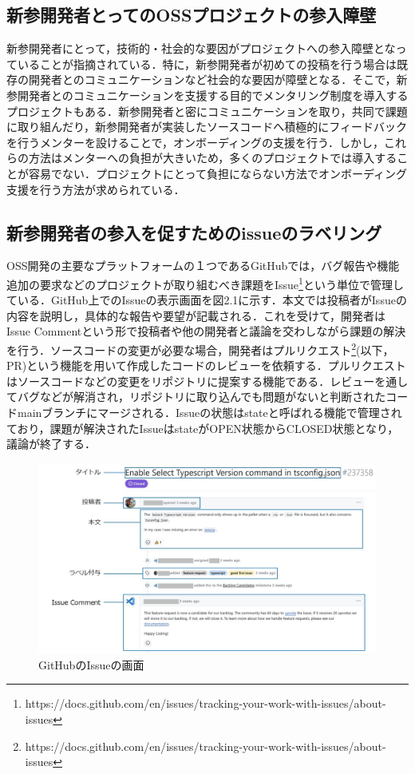 \documentclass[11pt]{jreport}
\begin{document}
\subsection{新参開発者とってのOSSプロジェクトの参入障壁}
新参開発者にとって，技術的・社会的な要因がプロジェクトへの参入障壁となっていることが指摘されている\cite{sosial}．特に，新参開発者が初めての投稿を行う場合は既存の開発者とのコミュニケーションなど社会的な要因が障壁となる\cite{social barries}．そこで，新参開発者とのコミュニケーションを支援する目的でメンタリング制度\cite{menter1}\cite{menter2}を導入するプロジェクトもある．新参開発者と密にコミュニケーションを取り，共同で課題に取り組んだり，新参開発者が実装したソースコードへ積極的にフィードバックを行うメンターを設けることで，オンボーディングの支援を行う．しかし，これらの方法はメンターへの負担が大きいため，多くのプロジェクトでは導入することが容易でない．プロジェクトにとって負担にならない方法でオンボーディング支援を行う方法が求められている．

\subsection{新参開発者の参入を促すためのissueのラベリング}
OSS開発の主要なプラットフォームの１つであるGitHubでは，バグ報告や機能追加の要求などのプロジェクトが取り組むべき課題をIssue\footnote{https://docs.github.com/en/issues/tracking-your-work-with-issues/about-issues}という単位で管理している．GitHub上でのIssueの表示画面を図2.1に示す．本文では投稿者がIssueの内容を説明し，具体的な報告や要望が記載される．これを受けて，開発者はIssue Commentという形で投稿者や他の開発者と議論を交わしながら課題の解決を行う．ソースコードの変更が必要な場合，開発者はプルリクエスト\footnote{https://docs.github.com/en/issues/tracking-your-work-with-issues/about-issues}(以下，PR)という機能を用いて作成したコードのレビューを依頼する．プルリクエストはソースコードなどの変更をリポジトリに提案する機能である．レビューを通してバグなどが解消され，リポジトリに取り込んでも問題がないと判断されたコードmainブランチにマージされる．Issueの状態はstateと呼ばれる機能で管理されており，課題が解決されたIssueはstateがOPEN状態からCLOSED状態となり，議論が終了する．

\begin{figure}[t]
\centerline{\includegraphics[width=0.9\linewidth]{@BSthesis2024_Nakai/BSthesis2024_Nakai_fig/issue_page.jpg}}
\caption{GitHubのIssueの画面}
\label{fig:milestone}
\end{figure}
\end{document}

